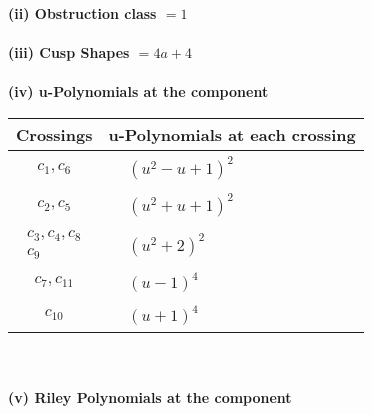 \documentclass[1p]{elsarticle_modified}
\theoremstyle{definition}
\begin{document}
\flushleft \textbf{(ii) Obstruction class $= 1$}\\~\\
\flushleft \textbf{(iii) Cusp Shapes $= 4 a+4$}\\~\\
\newpage\renewcommand{\arraystretch}{1}
\flushleft \textbf{(iv) u-Polynomials at the component}\newline \\
\begin{tabular}{m{50pt}|m{274pt}}
Crossings & \hspace{64pt}u-Polynomials at each crossing \\
\hline $$\begin{aligned}c_{1},c_{6}\end{aligned}$$&$\begin{aligned}
&(u^2- u+1)^2
\end{aligned}$\\
\hline $$\begin{aligned}c_{2},c_{5}\end{aligned}$$&$\begin{aligned}
&(u^2+u+1)^2
\end{aligned}$\\
\hline $$\begin{aligned}c_{3},c_{4},c_{8}\\c_{9}\end{aligned}$$&$\begin{aligned}
&(u^2+2)^2
\end{aligned}$\\
\hline $$\begin{aligned}c_{7},c_{11}\end{aligned}$$&$\begin{aligned}
&(u-1)^4
\end{aligned}$\\
\hline $$\begin{aligned}c_{10}\end{aligned}$$&$\begin{aligned}
&(u+1)^4
\end{aligned}$\\
\hline
\end{tabular}\\~\\
\newpage\renewcommand{\arraystretch}{1}
\flushleft \textbf{(v) Riley Polynomials at the component}\newline \\
\end{document}
